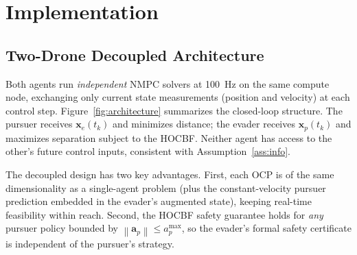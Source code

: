 \documentclass[lettersize,journal]{IEEEtran}
\theoremstyle{definition}
\theoremstyle{remark}
\newcommand{\norm}[1]{\left\| #1 \right\|}
\newcommand{\vect}[1]{\bm{#1}}
\begin{document}
\section{Implementation}
\label{sec:impl}

\subsection{Two-Drone Decoupled Architecture}
\label{sec:architecture}

Both agents run \emph{independent} NMPC solvers at \SI{100}{\hertz}
on the same compute node, exchanging only current state measurements
(position and velocity) at each control step.
Figure~\ref{fig:architecture} summarizes the closed-loop structure.
The pursuer receives $\vect{x}_e(t_k)$ and minimizes distance;
the evader receives $\vect{x}_p(t_k)$ and maximizes separation
subject to the HOCBF.
Neither agent has access to the other's future control inputs,
consistent with Assumption~\ref{ass:info}.

The decoupled design has two key advantages.
First, each OCP is of the same dimensionality as a single-agent
problem (plus the constant-velocity pursuer prediction embedded in
the evader's augmented state), keeping real-time feasibility within
reach.
Second, the HOCBF safety guarantee holds for \emph{any} pursuer
policy bounded by $\norm{\vect{a}_p}\leq a_p^{\max}$, so the
evader's formal safety certificate is independent of the pursuer's
strategy.
\end{document}
